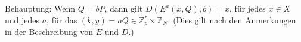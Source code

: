 \documentclass[a4paper]{article}
\begin{document}
\begin{multicols}{3}
    Behauptung: Wenn $Q=bP$, dann gilt $D(E^a (x,Q),b) =x$, für jedes $x\in X$ und jedes $a$, für das $(k,y) =aQ\in\mathbb{Z}^*_p \times\mathbb{Z}_N$. (Dies gilt nach den Anmerkungen in der Beschreibung von $E$ und $D$.)

\end{multicols}
\end{document}
